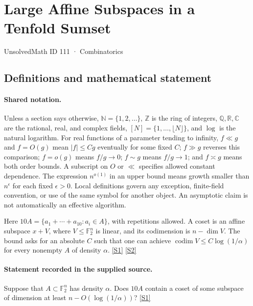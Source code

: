 \documentclass[11pt,a4paper]{article}
\newcommand{\N}{\mathbb{N}}
\newcommand{\Z}{\mathbb{Z}}
\newcommand{\Q}{\mathbb{Q}}
\newcommand{\R}{\mathbb{R}}
\newcommand{\C}{\mathbb{C}}
\newcommand{\F}{\mathbb{F}}
\newcommand{\sref}[2]{\hyperlink{source:#1:#2}{[S#2]}}
\begin{document}

\setcounter{section}{110}

\section{Large Affine Subspaces in a Tenfold Sumset}\label{111}

{\small\sffamily UnsolvedMath ID 111 · Combinatorics}

\subsection{Definitions and mathematical statement}

\paragraph{Shared notation.}Unless a section says otherwise, $\N=\{1,2,\ldots\}$,
$\Z$ is the ring of integers, $\Q,\R,\C$ are the rational, real, and complex
fields, $[N]=\{1,\ldots,\lfloor N\rfloor\}$, and $\log$ is the natural
logarithm. For real functions of a parameter tending to infinity,
$f\ll g$ and $f=O(g)$ mean $|f|\leq Cg$ eventually for some fixed $C$;
$f\gg g$ reverses this comparison; $f=o(g)$ means $f/g\to0$;
$f\sim g$ means $f/g\to1$; and $f\asymp g$ means both order bounds.
A subscript on $O$ or $\ll$ specifies allowed constant dependence.
The expression $n^{o(1)}$ in an upper bound means growth smaller than
$n^\epsilon$ for each fixed $\epsilon>0$. Local definitions govern any
exception, finite-field convention, or use of the same symbol for another
object. An asymptotic claim is not automatically an effective algorithm.



Here $10A=\{a_1+\cdots+a_{10}:a_i\in A\}$, with repetitions allowed. A coset is an affine subspace $x+V$, where $V\leq\F_2^n$ is linear, and its codimension is $n-\dim V$. The bound asks for an absolute $C$ such that one can achieve $\operatorname{codim}V\leq C\log(1/\alpha)$ for every nonempty $A$ of density $\alpha$. \sref{111}{1} \sref{111}{2}

\paragraph{Statement recorded in the supplied source.}
Suppose that $A \subset \mathbb{F}_2^n$ has density $\alpha$. Does $10A$ contain a coset of some subspace of dimension at least $n - O(\log(1/\alpha))$? \sref{111}{1}
\end{document}
